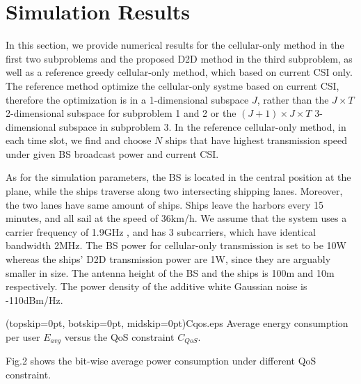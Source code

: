 \documentclass{ieeeaccess}
\begin{document}
\section{Simulation Results}

In this section, we provide numerical results for the cellular-only method in the first two subproblems and the proposed D2D method in the third subproblem, as well as a reference greedy cellular-only method, which based on current CSI only. The reference method optimize the cellular-only systme based on current CSI, therefore the optimization is in a 1-dimensional subspace $J$, rather than the $J \times T$ 2-dimensional subspace for subproblem 1 and 2 or the $\left( {J + 1} \right) \times J \times T$ 3-dimensional subspace in subproblem 3. In the reference cellular-only method, in each time slot, we find and choose $N$ ships that have highest transmission speed under given BS broadcast power and current CSI.

As for the simulation parameters, the BS is located in the central position at the plane, while the ships traverse along two intersecting shipping lanes. Moreover, the two lanes have same amount of ships. Ships leave the harbors every 15 minutes, and all sail at the speed of 36km/h. We assume that the system uses a carrier frequency of 1.9GHz , and has 3 subcarriers, which have identical bandwidth 2MHz. The BS power for cellular-only transmission is set to be 10W whereas the ships' D2D transmission power are 1W, since they are arguably smaller in size. The antenna height of the BS and the ships is 100m and 10m respectively. The power density of the additive white Gaussian noise is -110dBm/Hz.





\Figure[t!](topskip=0pt, botskip=0pt, midskip=0pt){Cqos.eps}
{Average energy consumption per user $E_{avg}$ versus the QoS constraint ${C_{QoS}}$.\label{fig2}}


Fig.2 shows the bit-wise average power consumption under different QoS constraint.
\end{document}
